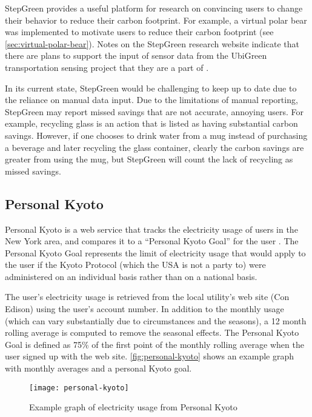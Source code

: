 StepGreen provides a useful platform for research on convincing users to change their behavior to reduce their carbon footprint. For example, a virtual polar bear was implemented to motivate users to reduce their carbon footprint (see \autoref{sec:virtual-polar-bear}). Notes on the StepGreen research website \cite{stepgreen-research-website} indicate that there are plans to support the input of sensor data from the UbiGreen transportation sensing project that they are a part of \cite{ubigreen-website}.

In its current state, StepGreen would be challenging to keep up to date due to the reliance on manual data input. Due to the limitations of manual reporting, StepGreen may report missed savings that are not accurate, annoying users. For example, recycling glass is an action that is listed as having substantial carbon savings. However, if one chooses to drink water from a mug instead of purchasing a beverage and later recycling the glass container, clearly the carbon savings are greater from using the mug, but StepGreen will count the lack of recycling as missed savings.

\subsection{Personal Kyoto}
\label{sec:personal-kyoto}

Personal Kyoto is a web service that tracks the electricity usage of users in the New York area, and compares it to a ``Personal Kyoto Goal'' for the user \cite{Personal-Kyoto-website}. The Personal Kyoto Goal represents the limit of electricity usage that would apply to the user if the Kyoto Protocol (which the USA is not a party to) were administered on an individual basis rather than on a national basis.

The user's electricity usage is retrieved from the local utility's web site (Con Edison) using the user's account number. In addition to the monthly usage (which can vary substantially due to circumstances and the seasons), a 12 month rolling average is computed to remove the seasonal effects. The Personal Kyoto Goal is defined as 75\% of the first point of the monthly rolling average when the user signed up with the web site. \autoref{fig:personal-kyoto} shows an example graph with monthly averages and a personal Kyoto goal.

\begin{figure}[htbp]
	\centering
		\texttt{[image: personal-kyoto]}
		\caption{Example graph of electricity usage from Personal Kyoto}
		\label{fig:personal-kyoto}
\end{figure}


